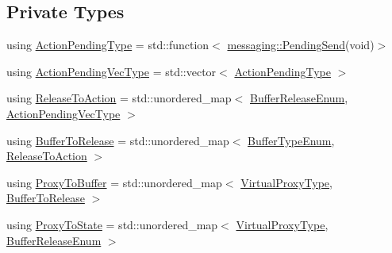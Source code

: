 \subsection*{Private Types}
\begin{DoxyCompactItemize}
\item 
using \hyperlink{structvt_1_1vrt_1_1collection_1_1_collection_manager_a61252b0d805cdb8fdea35439de468001}{Action\+Pending\+Type} = std\+::function$<$ \hyperlink{structvt_1_1messaging_1_1_pending_send}{messaging\+::\+Pending\+Send}(void)$>$
\item 
using \hyperlink{structvt_1_1vrt_1_1collection_1_1_collection_manager_a3e6c49166f298e9aada17c9dcaa080dd}{Action\+Pending\+Vec\+Type} = std\+::vector$<$ \hyperlink{structvt_1_1vrt_1_1collection_1_1_collection_manager_a61252b0d805cdb8fdea35439de468001}{Action\+Pending\+Type} $>$
\item 
using \hyperlink{structvt_1_1vrt_1_1collection_1_1_collection_manager_abf98645da5d52c568fae8ed6f11ab82f}{Release\+To\+Action} = std\+::unordered\+\_\+map$<$ \hyperlink{namespacevt_1_1vrt_1_1collection_a2545006e681bacc1f00be9d5d6bdc8fa}{Buffer\+Release\+Enum}, \hyperlink{structvt_1_1vrt_1_1collection_1_1_collection_manager_a3e6c49166f298e9aada17c9dcaa080dd}{Action\+Pending\+Vec\+Type} $>$
\item 
using \hyperlink{structvt_1_1vrt_1_1collection_1_1_collection_manager_a47d2def9bdf4fb84026c615602779053}{Buffer\+To\+Release} = std\+::unordered\+\_\+map$<$ \hyperlink{namespacevt_1_1vrt_1_1collection_a1b1b082e2ff4e9e5d1b7227acd78db3f}{Buffer\+Type\+Enum}, \hyperlink{structvt_1_1vrt_1_1collection_1_1_collection_manager_abf98645da5d52c568fae8ed6f11ab82f}{Release\+To\+Action} $>$
\item 
using \hyperlink{structvt_1_1vrt_1_1collection_1_1_collection_manager_a8229b3026c5790ed0783bd34c404e359}{Proxy\+To\+Buffer} = std\+::unordered\+\_\+map$<$ \hyperlink{namespacevt_a1b417dd5d684f045bb58a0ede70045ac}{Virtual\+Proxy\+Type}, \hyperlink{structvt_1_1vrt_1_1collection_1_1_collection_manager_a47d2def9bdf4fb84026c615602779053}{Buffer\+To\+Release} $>$
\item 
using \hyperlink{structvt_1_1vrt_1_1collection_1_1_collection_manager_a47acf9cd5a988ba197fbef5097f75dde}{Proxy\+To\+State} = std\+::unordered\+\_\+map$<$ \hyperlink{namespacevt_a1b417dd5d684f045bb58a0ede70045ac}{Virtual\+Proxy\+Type}, \hyperlink{namespacevt_1_1vrt_1_1collection_a2545006e681bacc1f00be9d5d6bdc8fa}{Buffer\+Release\+Enum} $>$
\end{DoxyCompactItemize}
